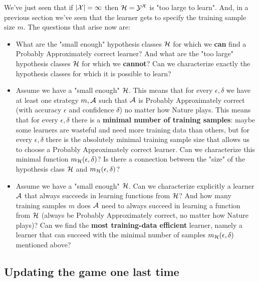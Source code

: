 {\vspace{3mm}
We've just seen that if $|\mathcal{X}|=\infty$ then $\mathcal{H}   = \mathcal{Y} ^{\mathcal{X}}$ is "too large to learn".
And, in a previous section we've seen that the learner gets to specify the training sample size $m$. 
The questions that arise now are:
\begin{itemize}
	\item What are the "small enough" hypothesis classes $\mathcal{H}$ for which we {\bf can} find a Probably Approximately correct learner?
	And what are the "too large" hypothesis classes $\mathcal{H}$ for which we {\bf cannot}? Can we characterize exactly the hypothesis classes for which it is possible to learn?
	\item Assume we have a "small enough" $\mathcal{H}$. This means that for every
	$\epsilon,\delta$ we have at least one strategy $m,\mathcal{A}$ such that $\mathcal{A}$
	is Probably Approximately correct (with accuracy $\epsilon$ and
	confidence $\delta$) no matter how Nature plays. This means that for
	every $\epsilon,\delta$ there is a {\bf minimal number of training
		samples}: maybe some learners are wasteful and need more training data
	than others, but for every $\epsilon,\delta$ there is the absolutely
	minimal training sample size that allows us to choose a Probably Approximately correct learner. Can we characterize this minimal function 
	$m_{\mathcal{H}}(\epsilon,\delta)$? Is there a connection between the "size" of the hypothesis class $\mathcal{H}$ and
	$m_{\mathcal{H}}(\epsilon,\delta)$?
	\item Assume we have a "small enough" $\mathcal{H}$. Can we characterize explicitly a learner $\mathcal{A}$ that always succeeds in learning functions from $\mathcal{H}$? And how many training samples $m$ does $\mathcal{A}$ need to always succeed in learning a function from $\mathcal{H}$ (always be Probably Approximately correct, no matter how Nature plays)? Can we find the {\bf most training-data efficient} learner, namely a learner that can succeed with the minimal number of samples $m_{\mathcal{H}}(\epsilon,\delta)$ mentioned above?
\end{itemize}


\subsection{Updating the game one last time}

}
